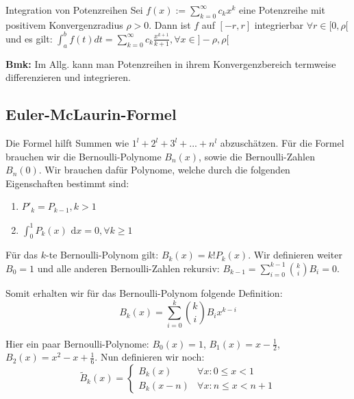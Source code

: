 \documentclass[a4paper,fontsize = 7pt]{scrartcl}
\def\dx{\text{ d}x}
\begin{document}
\begin{mainbox}{Integration von Potenzreihen}
  \vspace{-4pt}
  Sei $f(x) := \sum_{k = 0}^{\infty} c_k x^k$ eine Potenzreihe mit positivem Konvergenzradius $\rho > 0$. Dann ist $f$ auf $[-r,r]$ integrierbar $\forall r \in [0, \rho[$ und es gilt:
  $\int_a^b f(t)dt = \sum_{k = 0}^{\infty} c_k \frac{x^{k+1}}{k+1}, \forall x \in ]-\rho, \rho[$
  \vspace{-6pt}
\end{mainbox}
\textbf{Bmk:} Im Allg. kann man Potenzreihen in ihrem Konvergenzbereich termweise differenzieren und integrieren.

\subsection{Euler-McLaurin-Formel}
Die Formel hilft Summen wie $1^l + 2^l + 3^l + ... + n^l$ abzuschätzen.
Für die Formel brauchen wir die Bernoulli-Polynome $B_n(x)$, sowie die Bernoulli-Zahlen $B_n(0)$.
Wir brauchen dafür Polynome, welche durch die folgenden Eigenschaften bestimmt sind:

\begin{enumerate}
  \item $P'_k = P_{k-1}, k > 1$
  \item $\int_0^1 P_k(x)\dx = 0, \forall k \geq 1$
\end{enumerate}

Für das $k$-te Bernoulli-Polynom gilt: $B_k(x) = k!P_k(x)$. Wir definieren weiter $B_0=1$ und alle anderen Bernoulli-Zahlen rekursiv: $B_{k-1} = \sum_{i=0}^{k-1}{k \choose i}B_i = 0$.

Somit erhalten wir für das Bernoulli-Polynom folgende Definition: $$B_k(x) = \sum_{i=0}^{k}{k \choose i}B_ix^{k-i}$$

Hier ein paar Bernoulli-Polynome: $B_0(x) = 1$, $B_1(x) = x - \frac{1}{2}$, $B_2(x) = x^2 - x + \frac{1}{6}$. Nun definieren wir noch: $$\tilde{B}_k(x) = \begin{cases}
  B_k(x) & \forall x: 0 \leq x < 1 \\
  B_k(x-n) & \forall x: n \leq x < n + 1
\end{cases}$$
\end{document}
